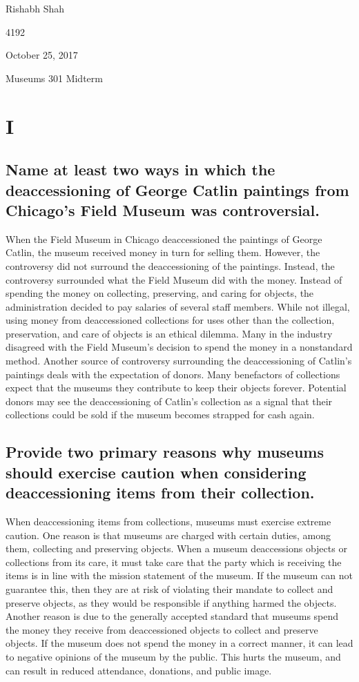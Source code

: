 \documentclass[11pt]{article}
\begin{document}
\singlespacing
{\Large\noindent Rishabh Shah

 4192

\noindent October 25, 2017

\noindent Museums 301 Midterm}
\section*{I}
\singlespacing
\subsection*{Name at least two ways in which the deaccessioning of George Catlin paintings from Chicago’s Field Museum was controversial.}

\doublespacing
When the Field Museum in Chicago deaccessioned the paintings of George Catlin, the museum received money in turn for selling them. However, the controversy did not surround the deaccessioning of the paintings. Instead, the controversy surrounded what the Field Museum did with the money. Instead of spending the money on collecting, preserving, and caring for objects, the administration decided to pay salaries of several staff members. While not illegal, using money from deaccessioned collections for uses other than the collection, preservation, and care of objects is an ethical dilemma. Many in the industry disagreed with the Field Museum's decision to spend the money in a nonstandard method. Another source of controversy surrounding the deaccessioning of Catlin's paintings deals with the expectation of donors. Many benefactors of collections expect that the museums they contribute to keep their objects forever. Potential donors may see the deaccessioning of Catlin's collection as a signal that their collections could be sold if the museum becomes strapped for cash again.

\singlespacing
\subsection*{Provide two primary reasons why museums should exercise caution when considering deaccessioning items from their collection.}

\doublespacing
When deaccessioning items from collections, museums must exercise extreme caution. One reason is that museums are charged with certain duties, among them, collecting and preserving objects. When a museum deaccessions objects or collections from its care, it must take care that the party which is receiving the items is in line with the mission statement of the museum. If the museum can not guarantee this, then they are at risk of violating their mandate to collect and preserve objects, as they would be responsible if anything harmed the objects. Another reason is due to the generally accepted standard that museums spend the money they receive from deaccessioned objects to collect and preserve objects. If the museum does not spend the money in a correct manner, it can lead to negative opinions of the museum by the public. This hurts the museum, and can result in reduced attendance, donations, and public image.
\end{document}
